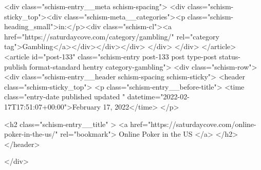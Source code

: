 {		<div class="schism-entry__meta schism-spacing">			<div class="schism-sticky_top"><div class="schism-meta__categories"><p class="schism-heading_small">in:</p><div class="schism-cl"><a href="https://saturdaycove.com/category/gambling/" rel="category tag">Gambling</a></div></div></div>		</div>
	</div>
</article>
<article id="post-133" class="schism-entry post-133 post type-post status-publish format-standard hentry category-gambling">
	<div class="schism-row">		<div class="schism-entry__header schism-spacing schism-sticky">			<header class="schism-sticky_top">				<p class="schism-entry__before-title">
					<time class="entry-date published updated " datetime="2022-02-17T17:51:07+00:00">February 17, 2022</time>				</p>

				<h2 class="schism-entry__title" >
					<a href="https://saturdaycove.com/online-poker-in-the-us/" rel="bookmark">
						Online Poker in the US					</a>
				</h2>
			</header>

					</div>

}
